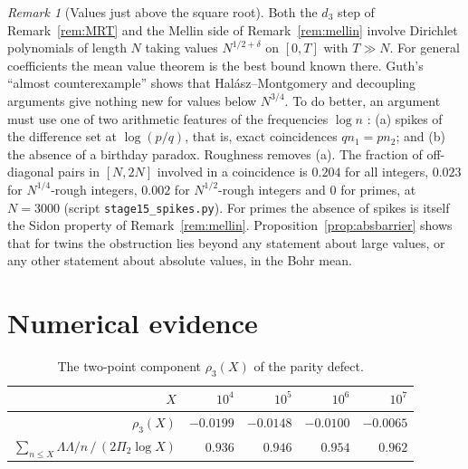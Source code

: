 \documentclass[11pt]{amsart}
\theoremstyle{definition}
\theoremstyle{remark}
\newtheorem{remark}[theorem]{Remark}
\begin{document}
\begin{remark}[Values just above the square root]\label{rem:sqrt}
Both the $d_3$ step of Remark~\ref{rem:MRT} and the Mellin side of Remark~\ref{rem:mellin} involve Dirichlet polynomials of length $N$ taking values $N^{1/2+\delta}$ on $[0,T]$ with $T\gg N$. For general coefficients the mean value theorem is the best bound known there. Guth's ``almost counterexample'' \cite[\S5.5]{Guth25} shows that Halász--Montgomery and decoupling arguments give nothing new for values below $N^{3/4}$. To do better, an argument must use one of two arithmetic features of the frequencies $\log n$ \cite[\S7]{Guth25}: (a) spikes of the difference set at $\log(p/q)$, that is, exact coincidences $qn_1=pn_2$; and (b) the absence of a birthday paradox. Roughness removes (a). The fraction of off-diagonal pairs in $[N,2N]$ involved in a coincidence is $0.204$ for all integers, $0.023$ for $N^{1/4}$-rough integers, $0.002$ for $N^{1/2}$-rough integers and $0$ for primes, at $N=3000$ (script \texttt{stage15\_spikes.py}). For primes the absence of spikes is itself the Sidon property of Remark~\ref{rem:mellin}. Proposition~\ref{prop:absbarrier} shows that for twins the obstruction lies beyond any statement about large values, or any other statement about absolute values, in the Bohr mean.
\end{remark}

\section{Numerical evidence}\label{sec:numerics}

\begin{table}[h]
\centering
\begin{tabular}{rrrrr}
\toprule
$X$ & $10^4$ & $10^5$ & $10^6$ & $10^7$\\
\midrule
$\rho_3(X)$ & $-0.0199$ & $-0.0148$ & $-0.0100$ & $-0.0065$\\
$\sum_{n\le X}\Lambda\Lambda/n\,/\,(2\Pi_2\log X)$ & $0.936$ & $0.946$ & $0.954$ & $0.962$\\
\bottomrule
\end{tabular}
\caption{The two-point component $\rho_3(X)$ of the parity defect.}
\end{table}
\end{document}
